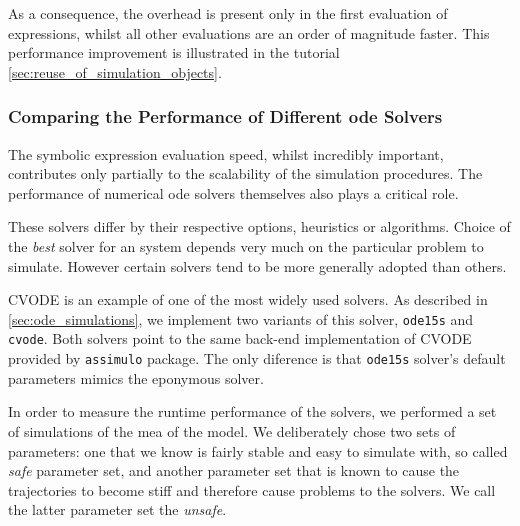 As a consequence, the overhead is present only in the first evaluation of expressions, whilst all other evaluations are an order of magnitude faster.
This performance improvement is illustrated in the tutorial \autoref{sec:reuse_of_simulation_objects}.



\subsubsection{Comparing the Performance of Different \gls{ode} Solvers}

The symbolic expression evaluation speed, whilst incredibly important, contributes only partially to the scalability of the simulation procedures.
The performance of numerical \gls{ode} solvers themselves also plays a critical role.

These solvers differ by their respective options, heuristics or algorithms.
Choice of the \emph{best} solver for an  system depends very much on the particular problem to simulate.
However certain solvers tend to be more generally adopted than others\cite{andersson_workbench_2012}.

CVODE\cite{hindmarsh_sundials_2005} is an example of one of the most widely used solvers.
As described in \autoref{sec:ode_simulations}, we implement two variants of this solver, \verb#ode15s# and \verb#cvode#.
Both solvers point to the same back-end implementation of CVODE provided by \verb#assimulo# package\cite{andersson_christian_assimulo:_????}.
The only diference is that \verb#ode15s# solver's default parameters mimics the eponymous \mat{} solver.

In order to measure the runtime performance of the solvers, we performed a set of simulations of the \acrlong{mea} of the \pft{} model.
We deliberately chose two sets of parameters: one that we know is fairly stable and easy to simulate with, so called \emph{safe} parameter set,
and another parameter set that is known to cause the trajectories to become stiff and therefore cause problems to the solvers.
We call the latter parameter set the \emph{unsafe}.
 
